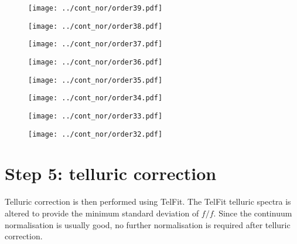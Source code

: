 \documentclass{article}
\begin{document}
\begin{figure}[H]
    \centering
    \texttt{[image: ../cont\_nor/order39.pdf]}
\end{figure}
\begin{figure}[H]
    \centering
    \texttt{[image: ../cont\_nor/order38.pdf]}
\end{figure}
\begin{figure}[H]
    \centering
    \texttt{[image: ../cont\_nor/order37.pdf]}
\end{figure}
\begin{figure}[H]
    \centering
    \texttt{[image: ../cont\_nor/order36.pdf]}
\end{figure}
\begin{figure}[H]
    \centering
    \texttt{[image: ../cont\_nor/order35.pdf]}
\end{figure}
\begin{figure}[H]
    \centering
    \texttt{[image: ../cont\_nor/order34.pdf]}
\end{figure}
\begin{figure}[H]
    \centering
    \texttt{[image: ../cont\_nor/order33.pdf]}
\end{figure}
\begin{figure}[H]
    \centering
    \texttt{[image: ../cont\_nor/order32.pdf]}
\end{figure}

\newpage

\section{Step 5: telluric correction}

Telluric correction is then performed using TelFit. 
The TelFit telluric spectra is altered to provide the minimum standard deviation of $f / f$.
Since the continuum normalisation is usually good, no further normalisation is required after telluric correction. 
\end{document}
